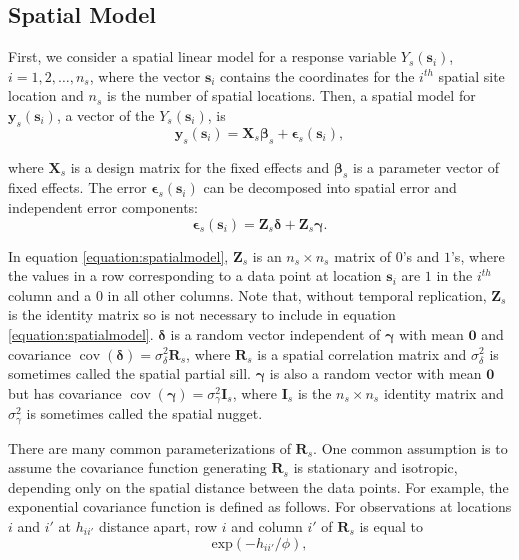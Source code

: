 \documentclass[]{interact}
\theoremstyle{plain}%
\theoremstyle{definition}
\theoremstyle{remark}
\begin{document}
\subsection{Spatial Model} \label{subsection:spatialmodel}

First, we consider a spatial linear model for a response variable
\(Y_s(\mathbf{s}_{i})\), \(i = 1, 2, \ldots, n_{s}\), where the vector
\(\mathbf{s}_i\) contains the coordinates for the \(i^{th}\) spatial
site location and \(n_s\) is the number of spatial locations. Then, a
spatial model for \(\mathbf{y}_s(\mathbf{s}_{i})\), a vector of the
\(Y_s(\mathbf{s}_{i})\), is \mbox{} \begin{equation}
\mathbf{y}_s(\mathbf{s}_{i}) = \mathbf{X}_s \bm{\beta}_s + \bm{\epsilon}_s(\mathbf{s}_{i}),
\end{equation}

\noindent where \(\mathbf{X}_s\) is a design matrix for the fixed
effects and \(\bm{\beta}_s\) is a parameter vector of fixed effects. The
error \(\bm{\epsilon}_s(\mathbf{s}_{i})\) can be decomposed into spatial
error and independent error components: \mbox{} \begin{equation}
\label{equation:spatialmodel}
\bm{\epsilon}_s(\mathbf{s}_{i}) = \mathbf{Z}_{s} \bm{\delta} + \mathbf{Z}_{s} \bm{\gamma}.
\end{equation}

\noindent In equation \ref{equation:spatialmodel}, \(\mathbf{Z}_{s}\) is
an \(n_s \times n_s\) matrix of \(0\)'s and \(1\)'s, where the values in
a row corresponding to a data point at location \(\mathbf{s}_{i}\) are
\(1\) in the \(i^{th}\) column and a \(0\) in all other columns. Note
that, without temporal replication, \(\mathbf{Z}_s\) is the identity
matrix so is not necessary to include in equation
\ref{equation:spatialmodel}. \(\bm{\delta}\) is a random vector
independent of \(\bm{\gamma}\) with mean \(\mathbf{0}\) and covariance
\(\mathop{\mathrm{{cov}}}(\bm{\delta}) = \sigma^2_{\delta} \mathbf{R}_{s}\),
where \(\mathbf{R}_s\) is a spatial correlation matrix and
\(\sigma^2_{\delta}\) is sometimes called the spatial partial sill.
\(\bm{\gamma}\) is also a random vector with mean \(\mathbf{0}\) but has
covariance
\(\mathop{\mathrm{{cov}}}(\bm{\gamma}) = \sigma^2_{\gamma} \mathbf{I}_{s}\),
where \(\mathbf{I}_s\) is the \(n_s \times n_s\) identity matrix and
\(\sigma^2_{\gamma}\) is sometimes called the spatial nugget.

There are many common parameterizations of \(\mathbf{R}_{s}\). One
common assumption is to assume the covariance function generating
\(\mathbf{R}_s\) is stationary and isotropic, depending only on the
spatial distance between the data points. For example, the exponential
covariance function is defined as follows. For observations at locations
\(i\) and \(i'\) at \(h_{ii'}\) distance apart, row \(i\) and column
\(i'\) of \(\mathbf{R}_{s}\) is equal to \mbox{} \begin{equation}
\label{equation:spatcov}
\text{exp}(-h_{ii'} / \phi),
\end{equation}
\end{document}
